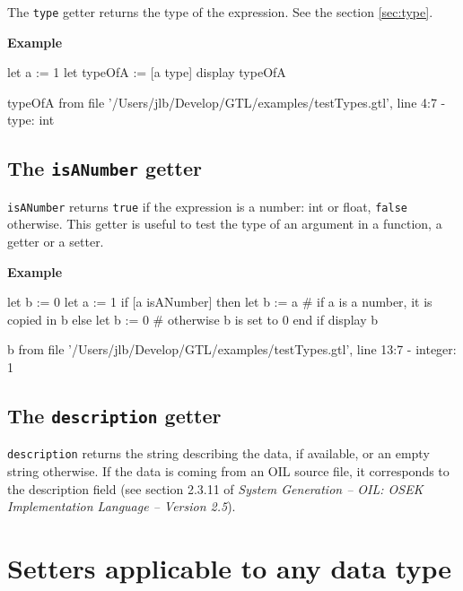 \documentclass[10pt,openright,twosides]{report}
\newcommand{\gtltype}[1]{{\small\ttfamily #1}}
\newcommand{\gtlinline}[1]{\colorbox{light-blue}{\lstinline[language=gtl]{#1}}}
\newcommand{\example}{\vspace{.75em}\noindent\textbf{Example}\vspace{0em}}
\begin{document}
The \gtlinline{type} getter returns the type of the expression. See the section \ref{sec:type}.

\example

\begin{gtl}
let a := 1
let typeOfA := [a type]
display typeOfA
\end{gtl}

\begin{console}
typeOfA from file '/Users/jlb/Develop/GTL/examples/testTypes.gtl', line 4:7
  - type: int
\end{console}

\subsection{The \texttt{isANumber} getter} 
\label{sec:isANumber}
 
\gtlinline{isANumber} returns \gtlinline{true} if the expression is a number: \gtltype{int} or \gtltype{float}, \gtlinline{false} otherwise. This getter is useful to test the type of an argument in a function, a getter or a setter.

\example

\begin{gtl}
let b := 0
let a := 1
if [a isANumber] then
  let b := a # if a is a number, it is copied in b
else
  let b := 0 # otherwise b is set to 0
end if
display b
\end{gtl}

\begin{console}
b from file '/Users/jlb/Develop/GTL/examples/testTypes.gtl', line 13:7
  - integer: 1
\end{console}


\subsection{The \texttt{description} getter} 
\label{sec:description}

\gtlinline{description} returns the string describing the data, if available, or an empty string otherwise. If the data is coming from an OIL source file, it corresponds to the description field (see section 2.3.11 of \emph{System Generation -- OIL: OSEK Implementation Language -- Version 2.5}).

\section{Setters applicable to any data type}
\end{document}
